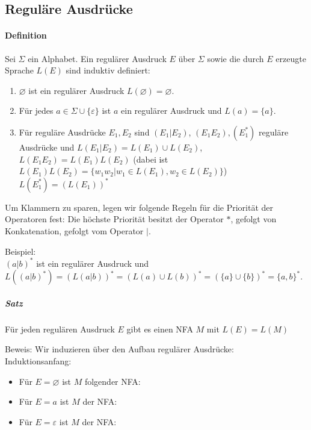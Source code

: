 \documentclass[a4paper]{scrartcl}
\begin{document}
\subsection{Reguläre Ausdrücke}
\paragraph{Definition} Sei $\Sigma$ ein Alphabet. Ein regulärer Ausdruck $E$ über $\Sigma$ sowie die durch $E$  erzeugte Sprache $L(E)$ sind induktiv definiert:
\begin{enumerate}
\item $\varnothing$ ist ein regulärer Ausdruck $L(\varnothing) = \varnothing$.
\item Für jedes $a \in \Sigma \cup \{ \varepsilon \}$ ist $a$ ein regulärer Ausdruck und $L(a) = \{ a \}$.
\item Für reguläre Ausdrücke $E_1,E_2$ sind $(E_1 | E_2)$,
$(E_1E_2),(E_1^*)$ reguläre Ausdrücke und $L(E_1|E_2) = L(E_1) \cup L(E_2)$,\\
$L(E_1E_2) = L(E_1)L(E_2)$ (dabei ist $L(E_1)L(E_2) = \{ w_1w_2 | w_1 \in L(E_1), w_2 \in L(E_2)\}$)\\
$L(E_1^*) = (L(E_1))^*$
\end{enumerate}

Um Klammern zu sparen, legen wir folgende Regeln für die Priorität der Operatoren fest: Die höchste Priorität besitzt der Operator $*$, gefolgt von Konkatenation, gefolgt vom Operator $|$.

Beispiel:\\
$(a|b)^*$ ist ein regulärer Ausdruck und\\
$L((a|b)^*) = (L(a|b))^* = (L(a) \cup L(b))^* = ( \{a\} \cup \{b\})^* = \{a,b\}^*$.

\subparagraph{Satz} Für jeden regulären Ausdruck $E$ gibt es einen NFA $M$ mit $L(E) = L(M)$

Beweis: Wir induzieren über den Aufbau regulärer Ausdrücke:\\
Induktionsanfang:
\begin{itemize}
\item Für $E= \varnothing$ ist $M$ folgender NFA:
\item Für $E=a$ ist $M$ der NFA:
\item Für $E= \varepsilon$ ist $M$ der NFA:
\end{itemize}
\end{document}

